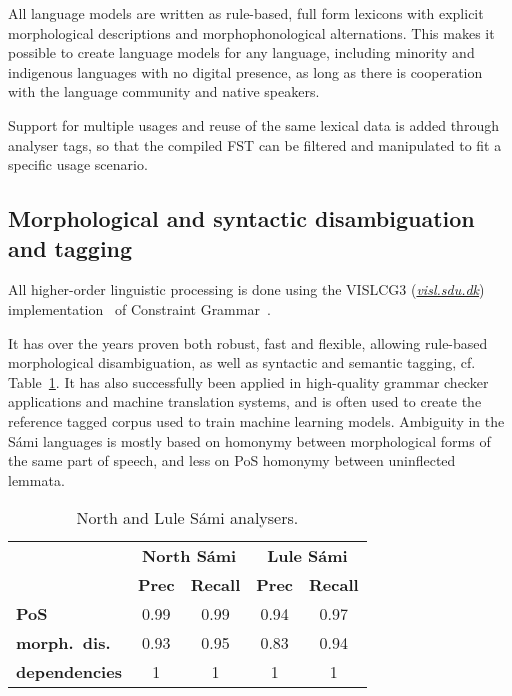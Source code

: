 \documentclass[free]{flammie}
\begin{document}
All language models are written as rule-based, full form lexicons with explicit
morphological descriptions and morphophonological alternations. This makes it
possible to create language models for any language, including minority and
indigenous languages with no digital presence, as long as there is cooperation
with the language community and native speakers.

Support for multiple usages and reuse of the same lexical data is added through
analyser tags, so that the compiled FST can be filtered and manipulated to fit a
specific usage scenario.




\subsection{Morphological and syntactic disambiguation and tagging}

All higher-order linguistic processing is done using the VISLCG3
(\textit{\href{http://visl.sdu.dk}{visl.sdu.dk}})
implementation~\cite{Didriksen2016constraint} of Constraint
Grammar~\cite{karlsson1990constraint}.

It has over the years proven both robust, fast and flexible, allowing rule-based
morphological disambiguation, as well as syntactic and semantic tagging, cf.
Table~\ref{samiPR}. It has also successfully been applied in high-quality
grammar checker applications and machine translation systems, and is often used
to create the reference tagged corpus used to train machine learning models.
Ambiguity in the Sámi languages is mostly based on homonymy between
morphological forms of the same part of speech, and less on PoS homonymy between
uninflected lemmata.

\begin{table}[htb]
\begin{center}
\begin{tabular}{lcccc}

\textbf{} & \multicolumn{2}{|c|}{\textbf{North Sámi}} &
    \multicolumn{2}{|c|}{\textbf{Lule Sámi}} \\

\textbf{} & \textbf{Prec} & \textbf{Recall} & \textbf{Prec} & \textbf{Recall} \\
\toprule
\textbf{PoS} & 0.99 & 0.99 & 0.94 & 0.97 \\
\textbf{morph.\ dis.} & 0.93 & 0.95 & 0.83 & 0.94 \\

\textbf{dependencies} & 1 & 1 & 1 & 1 \\
\bottomrule
\end{tabular} \\
\caption{North and Lule Sámi analysers.\label{table:anlyserpr}}\label{samiPR}
\end{center}
\end{table}
\end{document}

